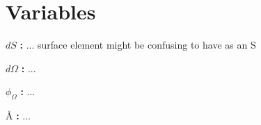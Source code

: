 \section{Variables}

\noindent ${dS}$ \textbf{:}
... surface element might be confusing to have as an S

\noindent ${d\Omega}$ \textbf{:}
...

\noindent ${\phi_{\Omega}}$ \textbf{:}
...

\noindent ${\text{\AA}}$ \textbf{:}
...
